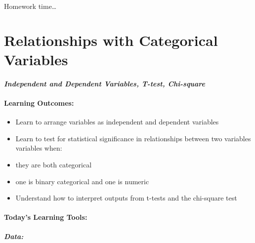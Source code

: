 \documentclass[
]{book}
\providecommand{\tightlist}{%
  \setlength{\itemsep}{0pt}\setlength{\parskip}{0pt}}
\begin{document}
Homework time\ldots{}

\hypertarget{relationships-with-categorical-variables}{%
\chapter{Relationships with Categorical Variables}\label{relationships-with-categorical-variables}}

\hypertarget{independent-and-dependent-variables-t-test-chi-square}{%
\subsubsection*{\texorpdfstring{\emph{Independent and Dependent Variables, T-test, Chi-square}}{Independent and Dependent Variables, T-test, Chi-square}}\label{independent-and-dependent-variables-t-test-chi-square}}

\hypertarget{learning-outcomes-6}{%
\subsubsection*{Learning Outcomes:}\label{learning-outcomes-6}}

\begin{itemize}
\tightlist
\item
  Learn to arrange variables as independent and dependent variables
\item
  Learn to test for statistical significance in relationships between two variables variables when:
\item
  they are both categorical
\item
  one is binary categorical and one is numeric
\item
  Understand how to interpret outputs from t-tests and the chi-square test
\end{itemize}

\hypertarget{todays-learning-tools-6}{%
\subsubsection*{Today's Learning Tools:}\label{todays-learning-tools-6}}

\hypertarget{data-6}{%
\paragraph*{\texorpdfstring{\emph{Data:}}{Data:}}\label{data-6}}
\end{document}
